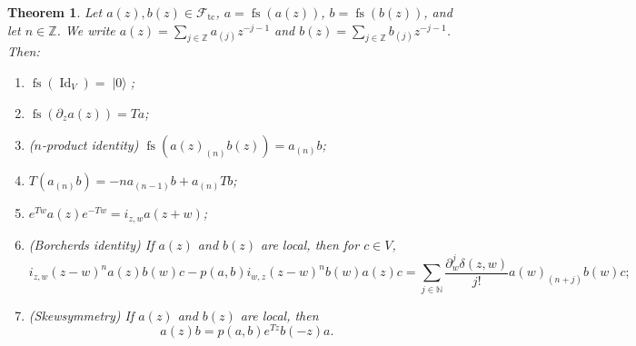 \documentclass[a4paper, 12pt, reqno]{amsart}
\newtheorem{theorem}{Theorem}[section]
\theoremstyle{remark}
\DeclareMathOperator{\Id}{Id}
\DeclareMathOperator{\vac}{|0\rangle}
\DeclareMathOperator{\fs}{fs}
\DeclareMathOperator{\tc}{tc}
\begin{document}
\begin{theorem}
  \label{thr:15}
  Let $a(z), b(z) \in \mathcal{F}_{\tc}$, $a = \fs(a(z))$, $b = \fs(b(z))$, and let $n \in \mathbb{Z}$.
  We write $a(z) = \sum_{j \in \mathbb{Z}}a_{(j)}z^{-j - 1}$ and $b(z) = \sum_{j \in \mathbb{Z}}b_{(j)}z^{-j - 1}$.
  Then:
  \begin{enumerate}
  \item $\fs(\Id_V) = \vac$;
  \item $\fs(\partial_za(z)) = Ta$;
  \item \emph{($n$-product identity)} $\fs(a(z)_{(n)}b(z)) = a_{(n)}b$;
  \item $T(a_{(n)}b) = -na_{(n - 1)}b + a_{(n)}Tb$;
  \item $e^{Tw}a(z)e^{-Tw} = i_{z, w}a(z + w)$;
  \item \emph{(Borcherds identity)} If $a(z)$ and $b(z)$ are local, then for $c \in V$,
    \begin{equation*}
      i_{z, w}(z - w)^na(z)b(w)c - p(a, b)i_{w, z}(z - w)^nb(w)a(z)c = \sum_{j \in \mathbb{N}}\frac{\partial^j_w\delta(z, w)}{j!}a(w)_{(n + j)}b(w)c;
    \end{equation*}
  \item \emph{(Skewsymmetry)} If $a(z)$ and $b(z)$ are local, then
    \begin{equation*}
      a(z)b = p(a, b)e^{Tz}b(-z)a.
    \end{equation*}
  \end{enumerate}
\end{theorem}
\end{document}
